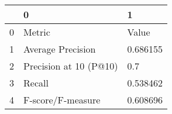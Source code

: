 \begin{tabular}{lll}
\toprule
{} &                       0 &         1 \\
\midrule
0 &                  Metric &     Value \\
1 &       Average Precision &  0.686155 \\
2 &  Precision at 10 (P@10) &       0.7 \\
3 &                  Recall &  0.538462 \\
4 &       F-score/F-measure &  0.608696 \\
\bottomrule
\end{tabular}
